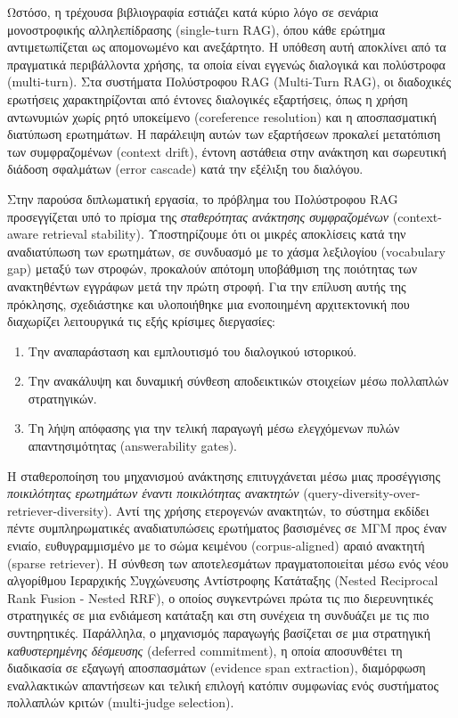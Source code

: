 Ωστόσο, η τρέχουσα βιβλιογραφία εστιάζει κατά κύριο λόγο σε σενάρια μονοστροφικής αλληλεπίδρασης (single-turn RAG), όπου κάθε ερώτημα αντιμετωπίζεται ως απομονωμένο και ανεξάρτητο. Η υπόθεση αυτή αποκλίνει από τα πραγματικά περιβάλλοντα χρήσης, τα οποία είναι εγγενώς διαλογικά και πολύστροφα (multi-turn). Στα συστήματα Πολύστροφου RAG (Multi-Turn RAG), οι διαδοχικές ερωτήσεις χαρακτηρίζονται από έντονες διαλογικές εξαρτήσεις, όπως η χρήση αντωνυμιών χωρίς ρητό υποκείμενο (coreference resolution) και η αποσπασματική διατύπωση ερωτημάτων. Η παράλειψη αυτών των εξαρτήσεων προκαλεί μετατόπιση των συμφραζομένων (context drift), έντονη αστάθεια στην ανάκτηση και σωρευτική διάδοση σφαλμάτων (error cascade) κατά την εξέλιξη του διαλόγου.

Στην παρούσα διπλωματική εργασία, το πρόβλημα του Πολύστροφου RAG προσεγγίζεται υπό το πρίσμα της \textit{σταθερότητας ανάκτησης συμφραζομένων} (context-aware retrieval stability). Υποστηρίζουμε ότι οι μικρές αποκλίσεις κατά την αναδιατύπωση των ερωτημάτων, σε συνδυασμό με το χάσμα λεξιλογίου (vocabulary gap) μεταξύ των στροφών, προκαλούν απότομη υποβάθμιση της ποιότητας των ανακτηθέντων εγγράφων μετά την πρώτη στροφή. Για την επίλυση αυτής της πρόκλησης, σχεδιάστηκε και υλοποιήθηκε μια ενοποιημένη αρχιτεκτονική που διαχωρίζει λειτουργικά τις εξής κρίσιμες διεργασίες:
\begin{enumerate}
    \item[$(\alpha)$] Την αναπαράσταση και εμπλουτισμό του διαλογικού ιστορικού.
    \item[$(\beta)$] Την ανακάλυψη και δυναμική σύνθεση αποδεικτικών στοιχείων μέσω πολλαπλών στρατηγικών.
    \item[$(\gamma)$] Τη λήψη απόφασης για την τελική παραγωγή μέσω ελεγχόμενων πυλών απαντησιμότητας (answerability gates).
\end{enumerate}

Η σταθεροποίηση του μηχανισμού ανάκτησης επιτυγχάνεται μέσω μιας προσέγγισης \textit{ποικιλότητας ερωτημάτων έναντι ποικιλότητας ανακτητών} (query-diversity-over-retriever-diversity). Αντί της χρήσης ετερογενών ανακτητών, το σύστημα εκδίδει πέντε συμπληρωματικές αναδιατυπώσεις ερωτήματος βασισμένες σε ΜΓΜ προς έναν ενιαίο, ευθυγραμμισμένο με το σώμα κειμένου (corpus-aligned) αραιό ανακτητή (sparse retriever). Η σύνθεση των αποτελεσμάτων πραγματοποιείται μέσω ενός νέου αλγορίθμου Ιεραρχικής Συγχώνευσης Αντίστροφης Κατάταξης (Nested Reciprocal Rank Fusion - Nested RRF), ο οποίος συγκεντρώνει πρώτα τις πιο διερευνητικές στρατηγικές σε μια ενδιάμεση κατάταξη και στη συνέχεια τη συνδυάζει με τις πιο συντηρητικές. Παράλληλα, ο μηχανισμός παραγωγής βασίζεται σε μια στρατηγική \textit{καθυστερημένης δέσμευσης} (deferred commitment), η οποία αποσυνθέτει τη διαδικασία σε εξαγωγή αποσπασμάτων (evidence span extraction), διαμόρφωση εναλλακτικών απαντήσεων και τελική επιλογή κατόπιν συμφωνίας ενός συστήματος πολλαπλών κριτών (multi-judge selection).

